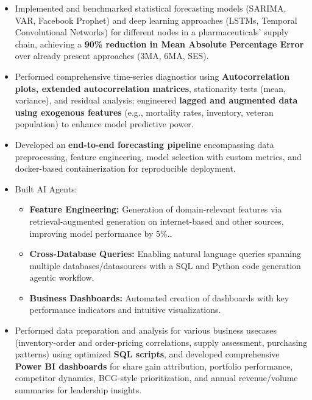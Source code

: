 \documentclass[letterpaper,11pt]{article}
\newcommand{\resumeItem}[1]{
  \item\small{
    {#1 \vspace{-2pt}}
  }
}
\newcommand{\resumeItemListStart}{\begin{itemize}}
\newcommand{\resumeItemListEnd}{\end{itemize}\vspace{-5pt}}
\begin{document}
\vspace{-5pt}
\resumeItemListStart
\resumeItem{Implemented and benchmarked statistical forecasting models (SARIMA, VAR, Facebook Prophet) and deep learning approaches (LSTMs, Temporal Convolutional Networks) for different nodes in a pharmaceuticals' supply chain, achieving a \textbf{90\% reduction in Mean Absolute Percentage Error} over already present approaches (3MA, 6MA, SES).}
\vspace{-3pt}
\resumeItem{Performed comprehensive time-series diagnostics using \textbf{Autocorrelation plots, extended autocorrelation matrices}, stationarity tests (mean, variance), and residual analysis; engineered \textbf{lagged and augmented data using exogenous features} (e.g., mortality rates, inventory, veteran population) to enhance model predictive power.}
\vspace{-3pt}
\resumeItem{Developed an \textbf{end-to-end forecasting pipeline} encompassing data preprocessing, feature engineering, model selection with custom metrics, and docker-based containerization for reproducible deployment.}
    \vspace{-3pt}
    \resumeItem{Built AI Agents: 
    \vspace{-3pt}
      \begin{itemize}[leftmargin=*,label=--,noitemsep,nolistsep]
        \item \textbf{Feature Engineering:} Generation of domain-relevant features via retrieval-augmented generation on internet-based and other sources, improving model performance by 5\%..
        \item \textbf{Cross-Database Queries:} Enabling natural language queries spanning multiple databases/datasources with a SQL and Python code generation agentic workflow.
        \item \textbf{Business Dashboards:} Automated creation of dashboards with key performance indicators and intuitive visualizations.
      \end{itemize}
    }
    \vspace{-3pt}
\resumeItem{Performed data preparation and analysis for various business usecases (inventory-order and order-pricing correlations, supply assessment, purchasing patterns) using optimized \textbf{SQL scripts}, and developed comprehensive \textbf{Power BI dashboards} for share gain attribution, portfolio performance, competitor dynamics, BCG-style prioritization, and annual revenue/volume summaries for leadership insights.}
  \resumeItemListEnd
\vspace{-5pt}
\vspace{-5pt}
\end{document}
